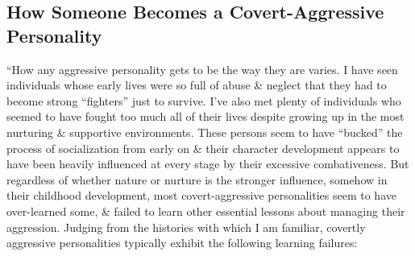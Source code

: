 \documentclass{article}
\numberwithin{equation}{section}
\begin{document}
\subsection{How Someone Becomes a Covert-Aggressive Personality}
``How any aggressive personality gets to be the way they are varies. I have seen individuals whose early lives were so full of abuse \& neglect that they had to become strong ``fighters'' just to survive. I've also met plenty of individuals who seemed to have fought too much all of their lives despite growing up in the most nurturing \& supportive environments. These persons seem to have ``bucked'' the process of socialization from early on \& their character development appears to have been heavily influenced at every stage by their excessive combativeness. But regardless of whether nature or nurture is the stronger influence, somehow in their childhood development, most covert-aggressive personalities seem to have over-learned some, \& failed to learn other essential lessons about managing their aggression. Judging from the histories with which I am familiar, covertly aggressive personalities typically exhibit the following learning failures:
\end{document}
